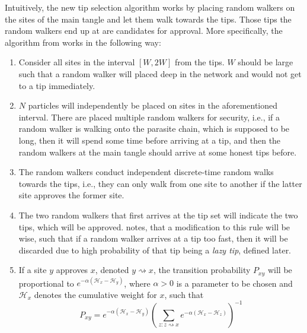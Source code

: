 Intuitively, the new tip selection algorithm works by placing random walkers on the sites of the main tangle and let them walk towards the tips. Those tips the random walkers end up at are candidates for approval. More specifically, the algorithm from \cite{tangle} works in the following way:
\begin{enumerate}
    \item Consider all sites in the interval $[W,2W]$ from the tips. $W$ should be large such that a random walker will placed deep in the network and would not get to a tip immediately.
    \item $N$ particles will independently be placed on sites in the aforementioned interval. There are placed multiple random walkers for security, i.e., if a random walker is walking onto the parasite chain, which is supposed to be long, then it will spend some time before arriving at a tip, and then the random walkers at the main tangle should arrive at some honest tips before.
    \item The random walkers conduct independent discrete-time random walks towards the tips, i.e., they can only walk from one site to another if the latter site approves the former site.
    \item The two random walkers that first arrives at the tip set will indicate the two tips, which will be approved. \cite{tangle} notes, that a modification to this rule will be wise, such that if a random walker arrives at a tip too fast, then it will be discarded due to high probability of that tip being a \emph{lazy tip}, defined later.
    \item If a site $y$ approves $x$, denoted $y \rightsquigarrow x$, the transition probability $P_{xy}$ will be proportional to $e^{-\alpha (\mathcal{H}_x - \mathcal{H}_y)}$, where $\alpha > 0$ is a parameter to be chosen and $\mathcal{H}_x$ denotes the cumulative weight for $x$, such that
    \begin{equation}
    \label{eq:mcmc-transition-probabilities}
        P_{xy} = e^{-\alpha (\mathcal{H}_x - \mathcal{H}_y)} \left(\sum_{z:z\rightsquigarrow x} e^{-\alpha(\mathcal{H}_x - \mathcal{H}_z)}\right)^{-1}
    \end{equation}
\end{enumerate}


